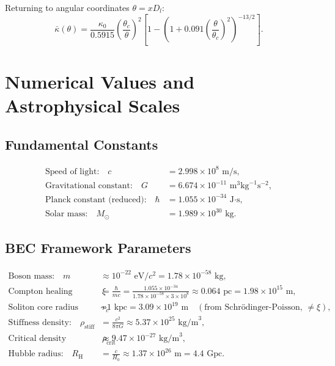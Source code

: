 \documentclass[11pt,a4paper]{article}
\newcommand{\rhocrit}{\ensuremath{\rho_{\mathrm{crit}}}}
\newcommand{\rhostiff}{\ensuremath{\rho_{\mathrm{stiff}}}}
\newcommand{\RH}{\ensuremath{R_{\mathrm{H}}}}
\newcommand{\Msun}{\ensuremath{M_\odot}}
\theoremstyle{definition}
\theoremstyle{remark}
\begin{document}
Returning to angular coordinates $\theta = x D_l$:
\begin{equation}
\bar{\kappa}(\theta) = \frac{\kappa_0}{0.5915}\left(\frac{\theta_c}{\theta}\right)^2 \left[1 - \left(1 + 0.091\left(\frac{\theta}{\theta_c}\right)^2\right)^{-13/2}\right].
\end{equation}

\section{Numerical Values and Astrophysical Scales}
\label{app:numerical_values}

\subsection{Fundamental Constants}

\begin{align}
\text{Speed of light:} \quad c &= 2.998 \times 10^8 \text{ m/s}, \\
\text{Gravitational constant:} \quad G &= 6.674 \times 10^{-11} \text{ m}^3\text{kg}^{-1}\text{s}^{-2}, \\
\text{Planck constant (reduced):} \quad \hbar &= 1.055 \times 10^{-34} \text{ J·s}, \\
\text{Solar mass:} \quad \Msun &= 1.989 \times 10^{30} \text{ kg}.
\end{align}

\subsection{BEC Framework Parameters}

\begin{align}
\text{Boson mass:} \quad m &\approx 10^{-22} \text{ eV}/c^2 = 1.78 \times 10^{-58} \text{ kg}, \\
\text{Compton healing length:} \quad \xi &= \frac{\hbar}{mc} = \frac{1.055 \times 10^{-34}}{1.78 \times 10^{-58} \times 3 \times 10^8} \approx 0.064 \text{ pc} = 1.98 \times 10^{15} \text{ m}, \\
\text{Soliton core radius (Jeans scale):} \quad r_c &\sim 1 \text{ kpc} = 3.09 \times 10^{19} \text{ m} \quad (\text{from Schr\"odinger-Poisson, } \neq \xi), \\
\text{Stiffness density:} \quad \rhostiff &= \frac{c^2}{8\pi G} \approx 5.37 \times 10^{25} \text{ kg/m}^3, \\
\text{Critical density (today):} \quad \rhocrit &\approx 9.47 \times 10^{-27} \text{ kg/m}^3, \\
\text{Hubble radius:} \quad \RH &= \frac{c}{H_0} \approx 1.37 \times 10^{26} \text{ m} = 4.4 \text{ Gpc}.
\end{align}
\end{document}
